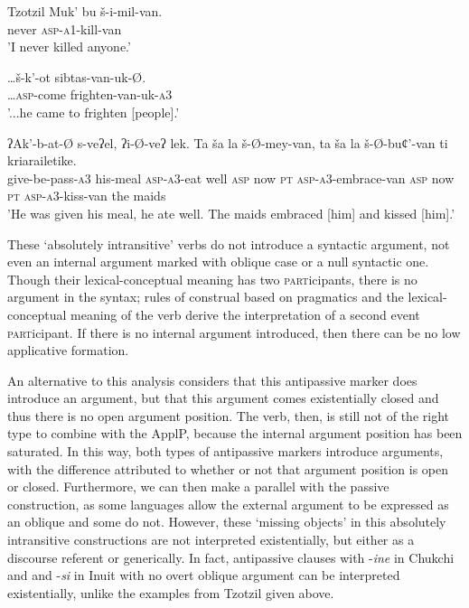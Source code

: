 \documentclass[output=paper,modfonts,nonflat,newtxmath]{langsci/langscibook}
\begin{document}
\ea%
     Tzotzil \citep{Aissen1983} \label{ex:basilico:16}
   \ea \label{ex:basilico:16a}
   \gll Muk’ bu š-i-mil-van.\\
   never \textsc{asp}-\textsc{a1}-kill-van\\
   \glt 'I never killed anyone.'
   
   \ex \label{ex:basilico:16b}
   \gll  …š-k’-ot sibtas-van-uk-Ø.\\
   …\textsc{asp}-come  frighten-van-uk-\textsc{a3}\\
   \glt '...he came to frighten [people].'
   
   \ex \label{ex:basilico:16c}
   \gll  ʔAk’-b-at-Ø s-veʔel, ʔi-Ø-veʔ lek. Ta ša la š-Ø-mey-van, ta ša la š-Ø-buȼ’-van ti kriarailetike. \\
   give-be-pass-\textsc{a3} his-meal \textsc{asp}-\textsc{a3}-eat well  \textsc{asp} now  \textsc{pt} \textsc{asp}-\textsc{a3}-embrace-van \textsc{asp} now \textsc{pt} \textsc{asp}-\textsc{a3}-kiss-van the maids\\
   \glt 'He was given his meal, he ate well. The maids embraced [him] and kissed [him].'
   \z
   \z

These ‘absolutely intransitive’ verbs do not introduce a syntactic argument, not even an internal argument marked with oblique case or a null syntactic one. Though their lexical-conceptual meaning has two \textsc{part}icipants, there is no argument in the syntax; rules of construal based on pragmatics and the lexical-conceptual meaning of the verb derive the interpretation of a second event \textsc{part}icipant. If there is no internal argument introduced, then there can be no low applicative formation. 

An alternative to this analysis considers that this antipassive marker does introduce an argument, but that this argument comes existentially closed and thus there is no open argument position. The verb, then, is still not of the right type to combine with the ApplP, because the internal argument position has been saturated. In this way, both types of antipassive markers introduce arguments, with the difference attributed to whether or not that argument position is open or closed. Furthermore, we can then make a parallel with the passive construction, as some languages allow the external argument to be expressed as an oblique and some do not. However, these ‘missing objects’ in this absolutely intransitive constructions are not interpreted existentially, but either as a discourse referent or generically. In fact, antipassive clauses with -\textit{ine} in Chukchi and and -\textit{si} in Inuit with no overt oblique argument can be interpreted existentially, unlike the examples from Tzotzil given above. 
\end{document}
